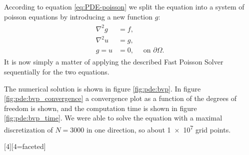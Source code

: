 According to equation \eqref{eq:PDE-poisson} we split the equation into a system of poisson equations by introducing a new function $g$:
\begin{align*}
  \begin{split}
    \nabla^2g &= f,\\
    \nabla^2u &= g,\\
    g = u &= 0,\quad \text{ on } \partial \Omega.
  \end{split}
\end{align*}
It is now simply a matter of applying the described Fast Poisson Solver sequentially for the two equations.

The numerical solution is shown in figure \ref{fig:pde:bvp}.
In figure \ref{fig:pde:bvp_convergence} a convergence plot as a function of the degrees of freedom is shown, and the computation time is shown in figure \ref{fig:pde:bvp_time}.
We were able to solve the equation with a maximal discretization of $N = 3000$ in one direction, so about \num{1e7} grid points.


[4][4=faceted]{  %
}

